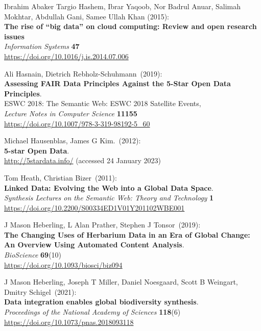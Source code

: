 \begin{thebibliography}{9}
Ibrahim Abaker Targio Hashem, Ibrar Yaqoob, Nor Badrul Anuar, Salimah Mokhtar, Abdullah Gani, Samee Ullah Khan (2015):\\
\textbf{The rise of “big data” on cloud computing: Review and open research issues} \\
\emph{Information Systems} \textbf{47} \\
\url{https://doi.org/10.1016/j.is.2014.07.006}

Ali Hasnain, Dietrich Rebholz-Schuhmann~(2019): \\
\textbf{Assessing FAIR Data Principles Against the 5-Star Open Data Principles}.\\
ESWC 2018: The Semantic Web: ESWC 2018 Satellite Events,\\
\emph{Lecture Notes in Computer Science} \textbf{11155}\\
\url{https://doi.org/10.1007/978-3-319-98192-5_60}

Michael Hausenblas, James G Kim.~(2012): \\
\textbf{5-star {Open Data}}. \\
\url{http://5stardata.info/} (accessed 24 January 2023)

Tom Heath, Christian Bizer~(2011): \\
\textbf{Linked Data: Evolving the Web into a Global Data Space}.\\
\emph{Synthesis Lectures on the Semantic Web: Theory and Technology} \textbf{1}\\
\url{https://doi.org/10.2200/S00334ED1V01Y201102WBE001}

J Mason Heberling, L Alan Prather, Stephen J Tonsor~(2019): \\
\textbf{The Changing Uses of Herbarium Data in an Era of Global Change: An Overview Using Automated Content Analysis}.\\
\emph{BioScience} \textbf{69}(10)\\
\url{https://doi.org/10.1093/biosci/biz094}

J Mason Heberling, Joseph T Miller, Daniel Noesgaard, Scott B Weingart, Dmitry Schigel~(2021): \\
\textbf{Data integration enables global biodiversity synthesis}.\\
\emph{Proceedings of the National Academy of Sciences} \textbf{118}(6)\\
\url{https://doi.org/10.1073/pnas.2018093118}


\end{thebibliography}
